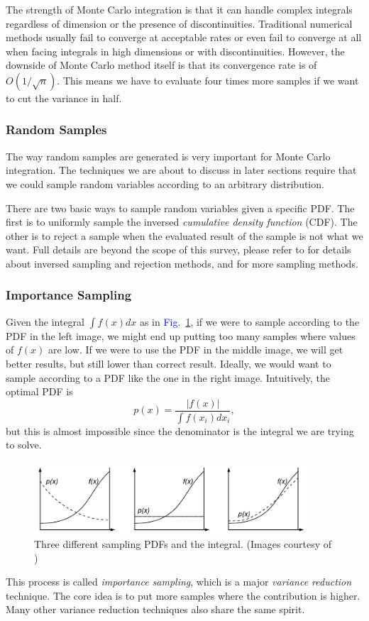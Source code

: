 \documentclass[]{book}
\renewcommand{\figurename}{\textcolor{blue}{Fig.\ }}
\begin{document}
The strength of Monte Carlo integration is that it can handle complex integrals regardless of dimension or the presence of discontinuities.
Traditional numerical methods usually fail to converge at acceptable rates or even fail to converge at all when facing integrals in high dimensions or with discontinuities.
However, the downside of Monte Carlo method itself is that its convergence rate is of $O(1/\sqrt{n})$.
This means we have to evaluate four times more samples if we want to cut the variance in half.

\subsubsection*{Random Samples}
The way random samples are generated is very important for Monte Carlo integration.
The techniques we are about to discuss in later sections require that we could sample random variables according to an arbitrary distribution.

There are two basic ways to sample random variables given a specific PDF.
The first is to uniformly sample the inversed \textit{cumulative density function} (CDF).
The other is to reject a sample when the evaluated result of the sample is not what we want.
Full details are beyond the scope of this survey, please refer to \cite{PBRT3e} for details about inversed sampling and rejection methods, and \cite{MChandbook} for more sampling methods.

\subsubsection*{Importance Sampling}
Given the integral $\int f(x) dx$ as in \figurename \ref{fig:GI:importanceSampling}, if we were to sample according to the PDF in the left image, we might end up putting too many samples where values of $f(x)$ are low.
If we were to use the PDF in the middle image, we will get better results, but still lower than correct result.
Ideally, we would want to sample according to a PDF like the one in the right image.
Intuitively, the optimal PDF is
\begin{equation*}
	p(x) = \frac{\left| f(x) \right|}{\int f(x_i)dx_i},
\end{equation*}
but this is almost impossible since the denominator is the integral we are trying to solve.
\begin{figure}
	\centering
	\includegraphics[width=4.0in]{img/GI-importanceSampling.png}
	\caption[Importance Sampling]{Three different sampling PDFs and the integral. (Images courtesy of \citeauthor{AdvancedGI})}
	\label{fig:GI:importanceSampling}
\end{figure}
This process is called \textit{importance sampling}, which is a major \textit{variance reduction} technique.
The core idea is to put more samples where the contribution is higher.
Many other variance reduction techniques also share the same spirit.
\end{document}
